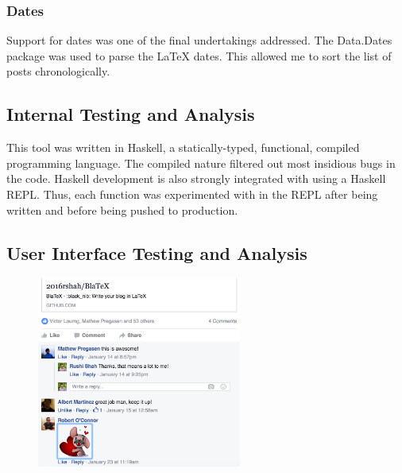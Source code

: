\documentclass[doc,apacite,12pt]{apa6}
\begin{document}
\subsubsection{Dates}

Support for dates was one of the final undertakings addressed. The Data.Dates package was used to parse the LaTeX dates. This allowed me to sort the list of posts chronologically.  


\subsection{Internal Testing and Analysis}
This tool was written in Haskell, a statically-typed, functional, compiled programming language. The compiled nature filtered out most insidious bugs in the code. Haskell development is also strongly integrated with using a Haskell REPL. Thus, each function was experimented with in the REPL after being written and before being pushed to production. 


\subsection{User Interface Testing and Analysis}

\begin{figure}
    \includegraphics[width=0.6\textwidth]{facebook}
  \centering
\end{figure}
\end{document}

